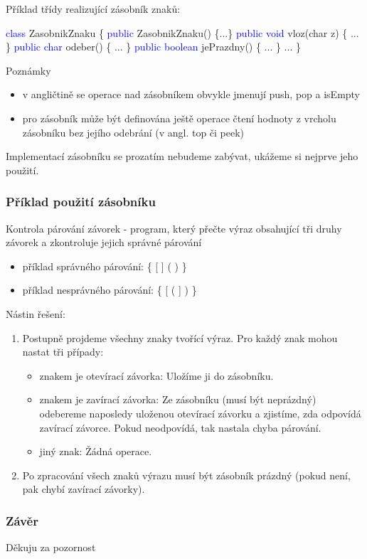 \documentclass{beamer}
\begin{document}
  \begin{frame}
   Příklad třídy realizující zásobník znaků:
   \begin{center}
      \textcolor{blue}{class} ZasobnikZnaku \{ \newline
\textcolor{blue}{public} ZasobnikZnaku() \{...\}\newline
\textcolor{blue}{public void} vloz(char z) \{ ... \}\newline
\textcolor{blue}{public char} odeber() \{ ... \}\newline
\textcolor{blue}{public boolean} jePrazdny() \{ ... \}\newline
...\newline
\} 
   \end{center}
 Poznámky
\begin{itemize}
\item v angličtině se operace nad zásobníkem obvykle jmenují push, pop a isEmpty
\item pro zásobník může být definována ještě operace čtení hodnoty z vrcholu
zásobníku bez jejího odebrání (v angl. top či peek)
\end{itemize}
 Implementací zásobníku se prozatím nebudeme zabývat, ukážeme si nejprve jeho
použití.
  \end{frame}

 \begin{frame}
    \frametitle{Příklad použití zásobníku}
    Kontrola párování závorek - program, který přečte výraz obsahující tři druhy
závorek a zkontroluje jejich správné párování
\begin{itemize}
\item příklad správného párování: \{ [ ] ( ) \}
\item příklad nesprávného párování: \{ [ ( ] ) \}
\end{itemize}
    \end{frame}
    
  \begin{frame}
      Nástin řešení:
      \begin{enumerate}
          \item  Postupně projdeme všechny znaky tvořící výraz. Pro každý znak mohou nastat tři případy:
          \begin{itemize}
              \item znakem je otevírací závorka: Uložíme ji do zásobníku.
              \item znakem je zavírací závorka: Ze zásobníku (musí být neprázdný)
odebereme naposledy uloženou otevírací závorku a zjistíme, zda
odpovídá zavírací závorce. Pokud neodpovídá, tak nastala chyba
párování.
\item jiný znak: Žádná operace.
          \end{itemize}
\item Po zpracování všech znaků výrazu musí být zásobník prázdný (pokud není, pak
chybí zavírací závorky).
      \end{enumerate}
  \end{frame}
  
  \begin{frame}
    \frametitle{Závěr}
    \begin{center}   
      Děkuju za pozornost
    \end{center}
  \end{frame}
\end{document}
